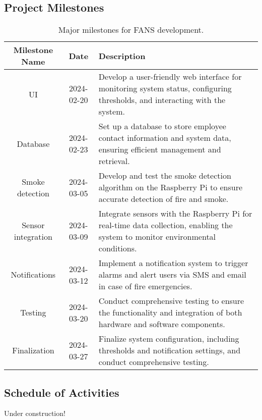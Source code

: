 \subsection{Project Milestones}

\begin{table}[H]
    \centering
    \begin{tabular}{| c | c | p{9cm} |}
        \hline
        \textbf{Milestone Name} & \textbf{Date} & \textbf{Description}                                                                            \\
        \hline
        UI                      & 2024-02-20    & Develop a user-friendly web interface for monitoring system status, configuring thresholds, and
        interacting with the system.                                                                                                              \\
        \hline Database         & 2024-02-23    & Set up a database to store employee contact information
        and system data, ensuring efficient management and retrieval.                                                                             \\
        \hline Smoke detection  & 2024-03-05    & Develop and test
        the smoke detection algorithm on the Raspberry Pi to ensure accurate detection of fire and smoke.                                         \\
        \hline
        Sensor integration      & 2024-03-09    & Integrate sensors with the Raspberry Pi for real-time data collection, enabling the
        system to monitor environmental conditions.                                                                                               \\
        \hline
        Notifications           & 2024-03-12    & Implement a notification system to trigger alarms and alert users via SMS and email
        in case of fire emergencies.                                                                                                              \\
        \hline
        Testing                 & 2024-03-20    & Conduct comprehensive testing to ensure the functionality and integration of both
        hardware and software components.                                                                                                         \\
        \hline
        Finalization            & 2024-03-27    & Finalize system configuration, including thresholds and notification settings, and
        conduct comprehensive testing.                                                                                                            \\
        \hline
    \end{tabular}
    \caption{Major milestones for FANS development.}
\end{table}

\subsection{Schedule of Activities}

Under construction!

